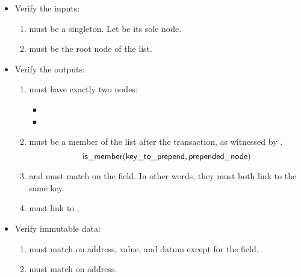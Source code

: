 \documentclass[../midgard.tex]{subfiles}
\begin{document}
\begin{description}
\begin{itemize}
            \item Verify the inputs:
            \begin{enumerate}[resume]
                \item {} must be a singleton. Let  be its sole node.
                \item {} must be the root node of the list.
            \end{enumerate}
            
            \item Verify the outputs:
            \begin{enumerate}[resume]
                \item {} must have exactly two nodes:
                    \begin{itemize}
                        \item {}
                        \item {}  
                    \end{itemize}
                \item {} must be a member of the list after the transaction, as witnessed by .  
                    \begin{equation*}
                        \mathsf{is\_member} (\mathsf{key\_to\_prepend}, \mathsf{prepended\_node})
                    \end{equation*}
                \item {} and  must match on the  field. In other words, they must both link to the same key.
                \item {} must link to .
            \end{enumerate}
            
            \item Verify immutable data:
            \begin{enumerate}[resume]
                \item {} must match  on address, value, and datum except for the  field.
                \item {} must match  on address.
            \end{enumerate}
        \end{itemize}
    

\end{description}
\end{document}
